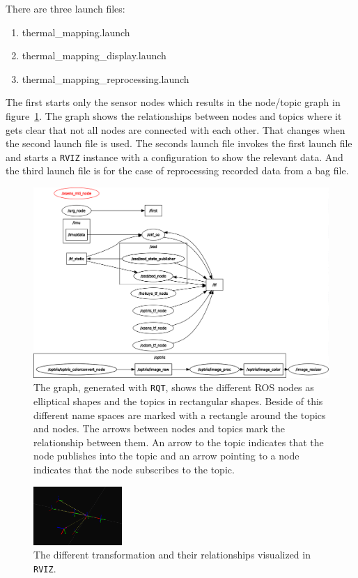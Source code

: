 There are three launch files:

\begin{enumerate}
    \item thermal\_mapping.launch
    \item thermal\_mapping\_display.launch
    \item thermal\_mapping\_reprocessing.launch
\end{enumerate}

The first starts only the sensor nodes which results in the node/topic graph in figure~\ref{fig:rosgraph_tf}.
The graph shows the relationships between nodes and topics where it gets clear that not all nodes are connected with each other.
That changes when the second launch file is used.
The seconds launch file invokes the first launch file and starts a \texttt{RVIZ} instance with a configuration to show the relevant data.
And the third launch file is for the case of reprocessing recorded data from a bag file.

\begin{figure}[h]
    \centering
    \includegraphics[width=\textwidth]{img/results/rosgraph_nodes_tf.png}
    \caption{The graph, generated with \texttt{RQT}, shows the different ROS nodes as elliptical shapes and the topics in rectangular shapes. Beside of this different name spaces are marked with a rectangle around the topics and nodes. The arrows between nodes and topics mark the relationship between them. An arrow to the topic indicates that the node publishes into the topic and an arrow pointing to a node indicates that the node subscribes to the topic.}
    \label{fig:rosgraph_tf}
\end{figure}

\begin{figure}
    \centering
    \includegraphics[width=0.3\textwidth]{img/results/tf_in_rviz.png}
    \caption{The different transformation and their relationships visualized in \texttt{RVIZ}.}
    \label{fig:tf_in_rviz}
\end{figure}


